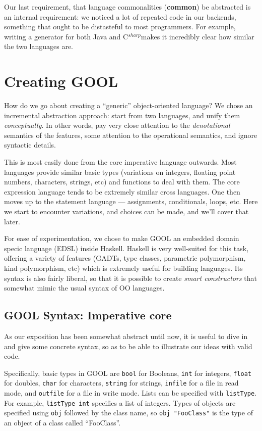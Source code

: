 \documentclass[sigplan,review,anonymous,prologue,dvipsnames]{acmart}
\newcommand{\Csharp}{C$^{sharp}$} %
\newcommand{\abbrev}[1]{\textbf{#1}}
\newcommand{\common}{\abbrev{common}}
\begin{document}
Our last requirement, that language commonalities (\common) be abstracted is
an internal requirement: we noticed a lot of repeated code in our backends, 
something that ought to be distasteful to most programmers. For example, writing
a generator for both Java and \Csharp makes it incredibly clear how similar the two
languages are.

\section{Creating GOOL} \label{sec:creating}

How do we go about creating a ``generic'' object-oriented language?
We chose an incremental abstraction approach: start from two languages,
and unify them \emph{conceptually}.  In other words, pay very close
attention to the \emph{denotational} semantics of the features, some
attention to the operational semantics, and ignore syntactic details.

This is most easily done from the core imperative language outwards.
Most languages provide similar basic types (variations on integers,
floating point numbers, characters, strings, etc) and functions to deal
with them. The core expression language tends to be extremely similar
cross languages. One then moves up to the statement language ---
assignments, conditionals, loops, etc.  Here we start to encounter
variations, and choices can be made, and we'll cover that later.

For ease of experimentation, we chose to make GOOL an embedded
domain specic language (EDSL) inside Haskell.  Haskell is very well-suited
for this task, offering a variety of features (GADTs, type classes,
parametric polymorphism, kind polymorphism, etc) which is extremely useful
for building languages.  Its syntax is also fairly liberal, so that it is
possible to create \emph{smart constructors} that somewhat mimic the
usual syntax of OO languages.

\subsection{GOOL Syntax: Imperative core} \label{ssec:syntax}

As our exposition has been somewhat abstract until now, it is useful to
dive in and give some concrete syntax, so as to be able to illustrate
our ideas with valid code.

Specifically, basic types in GOOL are \verb|bool| for Booleans, 
\verb|int| for integers, \verb|float| for doubles, \verb|char| 
for characters, \verb|string| for strings, \verb|infile| for a file 
in read mode, and \verb|outfile| for a file in write mode. Lists can be 
specified with \verb|listType|. For example, \verb|listType int| 
specifies a list of integers. Types of objects are specified using 
\verb|obj| followed by the class name, so \verb|obj "FooClass"| is the type of 
an object of a class called ``FooClass''. 
\end{document}
